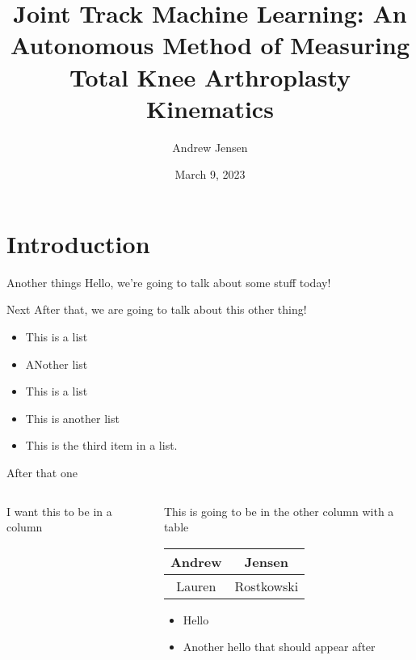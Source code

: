 \documentclass[
  american,
  ignorenonframetext,
  aspectratio=169]{beamer}
\title{Joint Track Machine Learning: An Autonomous
Method of Measuring Total Knee Arthroplasty
Kinematics}
\author{Andrew Jensen}
\date{March 9, 2023}
\institute{University of Florida}
\providecommand{\tightlist}{%
  \setlength{\itemsep}{0pt}\setlength{\parskip}{0pt}}
\begin{document}
\frame{\titlepage}

\begin{frame}[allowframebreaks]
  \tableofcontents[hideallsubsections]
\end{frame}
\hypertarget{introduction}{%
\section{Introduction}\label{introduction}}

\begin{frame}{Another things}
\protect\hypertarget{another-things}{}
Hello, we're going to talk about some stuff today!
\end{frame}

\begin{frame}{Next}
\protect\hypertarget{next}{}
After that, we are going to talk about this other
thing!

\begin{itemize}
\tightlist
\item
  This is a list
\item
  ANother list
\item
  This is a list
\item
  This is another list
\item
  This is the third item in a list.
\end{itemize}
\end{frame}

\begin{frame}{After that one}
\protect\hypertarget{after-that-one}{}
\begin{columns}[T]
\begin{column}{0.48\textwidth}
I want this to be in a column
\end{column}

\begin{column}{0.48\textwidth}
This is going to be in the other column with a
table

\begin{longtable}[]{@{}cc@{}}
\toprule
Andrew & Jensen\tabularnewline
\midrule
\endhead
Lauren & Rostkowski\tabularnewline
\bottomrule
\end{longtable}

\begin{itemize}[<+->]
\tightlist
\item
  Hello
\item
  Another hello that should appear after
\end{itemize}
\end{column}
\end{columns}
\end{frame}
\end{document}
